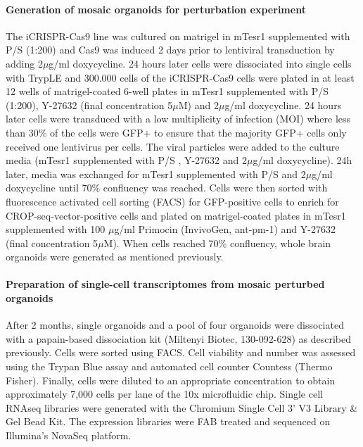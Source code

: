 \paragraph{Generation of mosaic organoids for perturbation experiment}
The iCRISPR-Cas9 line was cultured on matrigel in mTesr1 supplemented with P/S (1:200) and Cas9 was induced 2 days prior to lentiviral transduction by adding 2$\mu$g/ml doxycycline. 24 hours later cells were dissociated into single cells with TrypLE and 300.000 cells of the iCRISPR-Cas9 cells were plated in at least 12 wells of  matrigel-coated 6-well plates in mTesr1 supplemented with P/S (1:200), Y-27632 (final concentration 5$\mu$M) and 2$\mu$g/ml doxycycline. 24 hours later cells were transduced with a low multiplicity of infection (MOI) where less than 30\% of the cells were GFP+ to ensure that the majority GFP+ cells only received one lentivirus per cells. The viral particles were added to the culture media (mTesr1 supplemented with P/S , Y-27632 and 2$\mu$g/ml doxycycline). 24h later, media was exchanged for mTesr1 supplemented with P/S and 2$\mu$g/ml doxycycline until 70\% confluency was reached. Cells were then sorted with fluorescence  activated  cell sorting (FACS) for GFP-positive cells  to enrich for CROP-seq-vector-positive cells and plated on matrigel-coated plates in  mTesr1 supplemented with 100 $\mu$g/ml Primocin (InvivoGen, ant-pm-1) and Y-27632 (final concentration 5$\mu$M). When cells reached 70\% confluency, whole brain organoids were generated as mentioned previously.
 
\paragraph{Preparation of single-cell transcriptomes from mosaic perturbed organoids}
After 2 months, single organoids and a pool of four organoids were dissociated with a papain-based dissociation kit (Miltenyi Biotec, 130-092-628) as described previously. Cells were sorted using FACS. Cell viability and number was assessed using the Trypan Blue assay and automated cell counter Countess (Thermo Fisher). Finally, cells were diluted to an appropriate concentration to obtain approximately 7,000 cells per lane of the 10x microfluidic chip.  Single cell RNAseq libraries were generated with the Chromium Single Cell 3’ V3 Library \& Gel Bead Kit. The expression libraries were FAB treated and sequenced on Illumina’s NovaSeq platform.
 
